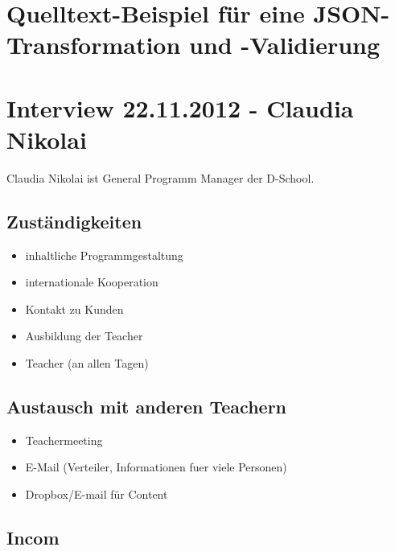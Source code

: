\label{app:anhang}

\section{Quelltext-Beispiel für eine JSON-Transformation und -Validierung}



\section{Interview 22.11.2012 - Claudia Nikolai }
\label{sec:interview_nikolai}
Claudia Nikolai ist General Programm Manager der D-School.

\subsection*{Zuständigkeiten}
\label{zustaendigkeiten}

\begin{itemize}
\item inhaltliche Programmgestaltung
\item internationale Kooperation
\item Kontakt zu Kunden
\item Ausbildung der Teacher
\item Teacher (an allen Tagen)
\end{itemize}

\subsection*{Austausch mit anderen Teachern}
\label{austauschmitanderenteachern}

\begin{itemize}
\item Teachermeeting
\item E-Mail (Verteiler, Informationen fuer viele Personen)
\item Dropbox\slash E-mail für Content
\end{itemize}

\subsection*{Incom}
\label{incom}

